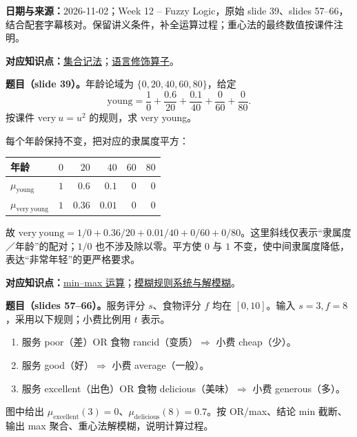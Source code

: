 \begingroup
\renewcommand{\recordid}[1]{}
\renewcommand{\relatedtopic}[2]{\hyperref[topic:#1]{#2}}


\textbf{日期与来源：}2026-11-02；Week 12 -- Fuzzy Logic，原始 slide 39、slides 57--66，结合配套字幕核对。保留讲义条件，补全运算过程；重心法的最终数值按课件注明。


\textbf{对应知识点：}\relatedtopic{SC3000-L11-T01}{集合记法}；\relatedtopic{SC3000-L11-T03}{语言修饰算子}。

\textbf{题目（slide 39）。}年龄论域为 $\{0,20,40,60,80\}$，给定
\[
 \mathrm{young}=\frac{1}{0}+\frac{0.6}{20}
 +\frac{0.1}{40}+\frac{0}{60}+\frac{0}{80}.
\]
按课件 $\mathrm{very}\ u=u^2$ 的规则，求 very young。

\begin{workedsolution}
每个年龄保持不变，把对应的隶属度平方：
\begin{center}
\small
\begin{tabular}{@{}lrrrrr@{}}
\toprule
年龄 & $0$ & $20$ & $40$ & $60$ & $80$ \\
\midrule
$\mu_{\mathrm{young}}$ & $1$ & $0.6$ & $0.1$ & $0$ & $0$ \\
$\mu_{\mathrm{very\ young}}$ & $1$ & $0.36$ & $0.01$ & $0$ & $0$ \\
\bottomrule
\end{tabular}
\end{center}
故 $\mathrm{very\ young}=1/0+0.36/20+0.01/40+0/60+0/80$。这里斜线仅表示“隶属度／年龄”的配对；$1/0$ 也不涉及除以零。平方使 $0$ 与 $1$ 不变，使中间隶属度降低，表达“非常年轻”的更严格要求。
\end{workedsolution}


\textbf{对应知识点：}\relatedtopic{SC3000-L11-T03}{min--max 运算}；\relatedtopic{SC3000-L11-T04}{模糊规则系统与解模糊}。

\textbf{题目（slides 57--66）。}服务评分 $s$、食物评分 $f$ 均在 $[0,10]$。输入 $s=3,f=8$，采用以下规则；小费比例用 $t$ 表示。
\begin{enumerate}
 \item 服务 poor（差）OR 食物 rancid（变质）$\Rightarrow$ 小费 cheap（少）。
 \item 服务 good（好）$\Rightarrow$ 小费 average（一般）。
 \item 服务 excellent（出色）OR 食物 delicious（美味）$\Rightarrow$ 小费 generous（多）。
\end{enumerate}
图中给出 $\mu_{\mathrm{excellent}}(3)=0$、$\mu_{\mathrm{delicious}}(8)=0.7$。按 OR/max、结论 min 截断、输出 max 聚合、重心法解模糊，说明计算过程。

